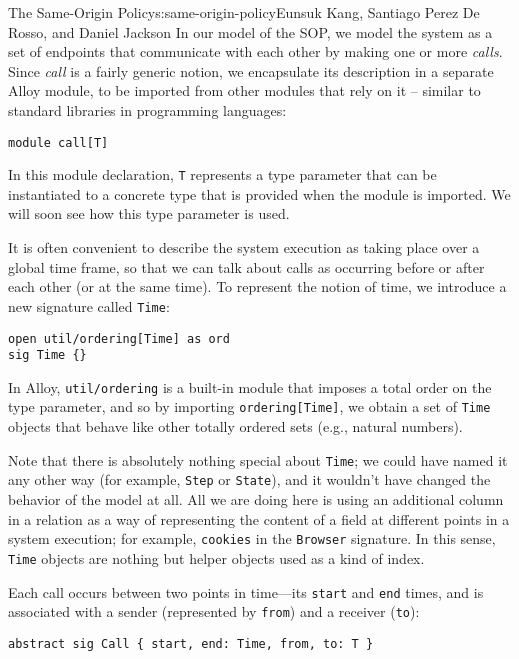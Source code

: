 \begin{aosachapter}{The Same-Origin Policy}{s:same-origin-policy}{Eunsuk Kang, Santiago Perez De Rosso, and Daniel Jackson}
In our model of the SOP, we model the system as a set of endpoints that
communicate with each other by making one or more \emph{calls}. Since
\emph{call} is a fairly generic notion, we encapsulate its description
in a separate Alloy module, to be imported from other modules that rely
on it -- similar to standard libraries in programming languages:

\begin{verbatim}
module call[T] 
\end{verbatim}

In this module declaration, \texttt{T} represents a type parameter that
can be instantiated to a concrete type that is provided when the module
is imported. We will soon see how this type parameter is used.

It is often convenient to describe the system execution as taking place
over a global time frame, so that we can talk about calls as occurring
before or after each other (or at the same time). To represent the
notion of time, we introduce a new signature called \texttt{Time}:

\begin{verbatim}
open util/ordering[Time] as ord
sig Time {}
\end{verbatim}

In Alloy, \texttt{util/ordering} is a built-in module that imposes a
total order on the type parameter, and so by importing
\texttt{ordering{[}Time{]}}, we obtain a set of \texttt{Time} objects
that behave like other totally ordered sets (e.g., natural numbers).

Note that there is absolutely nothing special about \texttt{Time}; we
could have named it any other way (for example, \texttt{Step} or
\texttt{State}), and it wouldn't have changed the behavior of the model
at all. All we are doing here is using an additional column in a
relation as a way of representing the content of a field at different
points in a system execution; for example, \texttt{cookies} in the
\texttt{Browser} signature. In this sense, \texttt{Time} objects are
nothing but helper objects used as a kind of index.

Each call occurs between two points in time---its \texttt{start} and
\texttt{end} times, and is associated with a sender (represented by
\texttt{from}) and a receiver (\texttt{to}):

\begin{verbatim}
abstract sig Call { start, end: Time, from, to: T } 
\end{verbatim}


\end{aosachapter}
